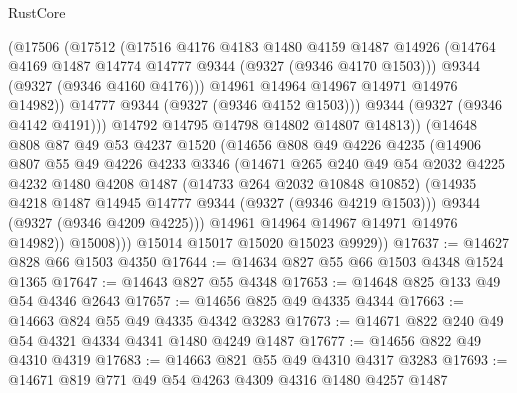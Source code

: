 \begin{lexlean}{RustCore}
\begin{coremodule}
                    (@17506
                      (@17512
                        (@17516
                          @4176
                          @4183
                          @1480
                          @4159
                          @1487
                          @14926
                          (@14764 @4169 @1487 @14774 @14777 @9344 (@9327 (@9346 @4170 @1503)))
                          @9344
                          (@9327 (@9346 @4160 @4176)))
                        @14961
                        @14964
                        @14967
                        @14971
                        @14976
                        @14982))
                    @14777
                    @9344
                    (@9327 (@9346 @4152 @1503)))
                  @9344
                  (@9327 (@9346 @4142 @4191)))
                @14792
                @14795
                @14798
                @14802
                @14807
                @14813))
            (@14648
              @808
              @87
              @49
              @53
              @4237
              @1520
              (@14656
                @808
                @49
                @4226
                @4235
                (@14906
                  @807
                  @55
                  @49
                  @4226
                  @4233
                  @3346
                  (@14671
                    @265
                    @240
                    @49
                    @54
                    @2032
                    @4225
                    @4232
                    @1480
                    @4208
                    @1487
                    (@14733 @264 @2032 @10848 @10852)
                    (@14935 @4218 @1487 @14945 @14777 @9344 (@9327 (@9346 @4219 @1503)))
                    @9344
                    (@9327 (@9346 @4209 @4225)))
                  @14961
                  @14964
                  @14967
                  @14971
                  @14976
                  @14982))
              @15008)))
        @15014
        @15017
        @15020
        @15023
        @9929))
@17637 := @14627 @828 @66 @1503 @4350
@17644 := @14634 @827 @55 @66 @1503 @4348 @1524 @1365
@17647 := @14643 @827 @55 @4348
@17653 := @14648 @825 @133 @49 @54 @4346 @2643
@17657 := @14656 @825 @49 @4335 @4344
@17663 := @14663 @824 @55 @49 @4335 @4342 @3283
@17673 := @14671 @822 @240 @49 @54 @4321 @4334 @4341 @1480 @4249 @1487
@17677 := @14656 @822 @49 @4310 @4319
@17683 := @14663 @821 @55 @49 @4310 @4317 @3283
@17693 := @14671 @819 @771 @49 @54 @4263 @4309 @4316 @1480 @4257 @1487

\end{coremodule}
\end{lexlean}
